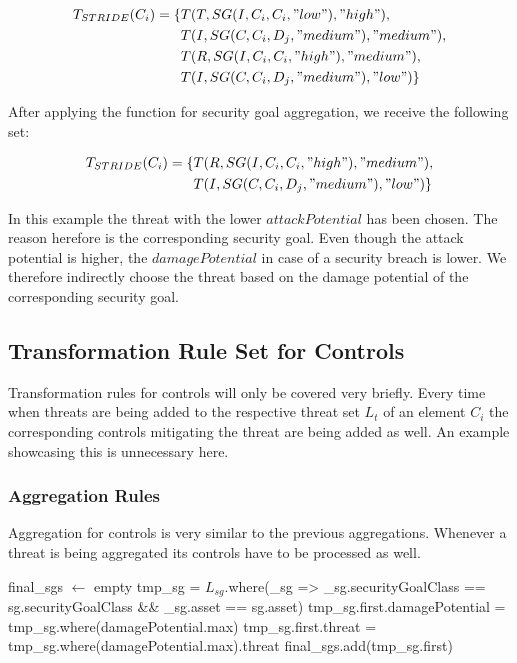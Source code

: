 \begin{align*}
T_{STRIDE}(C_i) = \{&T(T, SG(I,C_i,C_i,"low"), "high"),\\ 
&T(I, SG(C,C_i,D_j, "medium"), "medium"),\\ 
&T(R, SG(I,C_i,C_i,"high"), "medium"),\\ 
&T(I, SG(C,C_i,D_j, "medium"), "low")\}
\end{align*}

After applying the function for security goal aggregation, we receive the following set:

\begin{align*}
T_{STRIDE}(C_i) = \{&T(R, SG(I,C_i,C_i,"high"), "medium"),\\ 
&T(I, SG(C,C_i,D_j, "medium"), "low")\}
\end{align*}

In this example the threat with the lower $attackPotential$ has been chosen. The reason herefore is the corresponding security goal. Even though the attack potential is higher, the $damagePotential$ in case of a security breach is lower. We therefore indirectly choose the threat based on the damage potential of the corresponding security goal.

\subsection{Transformation Rule Set for Controls}

Transformation rules for controls will only be covered very briefly. Every time when threats are being added to the respective threat set $L_t$ of an element $C_i$ the corresponding controls mitigating the threat are being added as well. An example showcasing this is unnecessary here. 

\subsubsection{Aggregation Rules}
\label{subsubsec:control_aggregation}

Aggregation for controls is very similar to the previous aggregations. Whenever a threat is being aggregated its controls have to be processed as well. 

\begin{algorithm}[H] 
\begin{algorithmic}
\State final\_sgs $\gets$ empty
\State tmp\_sg = $L_{sg}$.where(\_sg => \_sg.securityGoalClass == sg.securityGoalClass  \&\& \_sg.asset == sg.asset)
\State tmp\_sg.first.damagePotential = tmp\_sg.where(damagePotential.max)
\State tmp\_sg.first.threat = tmp\_sg.where(damagePotential.max).threat
\State {}
\State final\_sgs.add(tmp\_sg.first)
\EndFor
\EndFunction
\end{algorithmic}
\end{algorithm}

